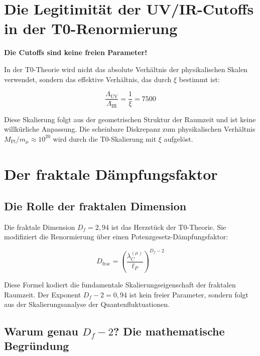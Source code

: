 \documentclass[12pt,a4paper]{article}
\theoremstyle{definition}
\begin{document}
	\section{Die Legitimität der UV/IR-Cutoffs in der T0-Renormierung}
	
	\begin{tcolorbox}[colback=blue!5!white,colframe=blue!75!black]
		\textbf{Die Cutoffs sind keine freien Parameter!}
	\end{tcolorbox}
	
	In der T0-Theorie wird nicht das absolute Verhältnis der physikalischen Skalen verwendet, sondern das effektive Verhältnis, das durch $\xi$ bestimmt ist:
	
	\begin{equation}
		\frac{\Lambda_{\text{UV}}}{\Lambda_{\text{IR}}} = \frac{1}{\xi} = 7500
	\end{equation}
	
	Diese Skalierung folgt aus der geometrischen Struktur der Raumzeit und ist keine willkürliche Anpassung. Die scheinbare Diskrepanz zum physikalischen Verhältnis $M_{\text{Pl}}/m_\mu \approx 10^{20}$ wird durch die T0-Skalierung mit $\xi$ aufgelöst.
	
	\section{Der fraktale Dämpfungsfaktor}
	
	\subsection{Die Rolle der fraktalen Dimension}
	
	Die fraktale Dimension $D_f = 2{,}94$ ist das Herzstück der T0-Theorie. Sie modifiziert die Renormierung über einen Potenzgesetz-Dämpfungsfaktor:
	
	\begin{equation}
		D_{\text{frac}} = \left(\frac{\lambda_C^{(\mu)}}{\ell_P}\right)^{D_f - 2}
	\end{equation}
	
	Diese Formel kodiert die fundamentale Skalierungseigenschaft der fraktalen Raumzeit. Der Exponent $D_f - 2 = 0{,}94$ ist kein freier Parameter, sondern folgt aus der Skalierungsanalyse der Quantenfluktuationen.
	
	\subsection{Warum genau $D_f - 2$? Die mathematische Begründung}
	
\end{document}
